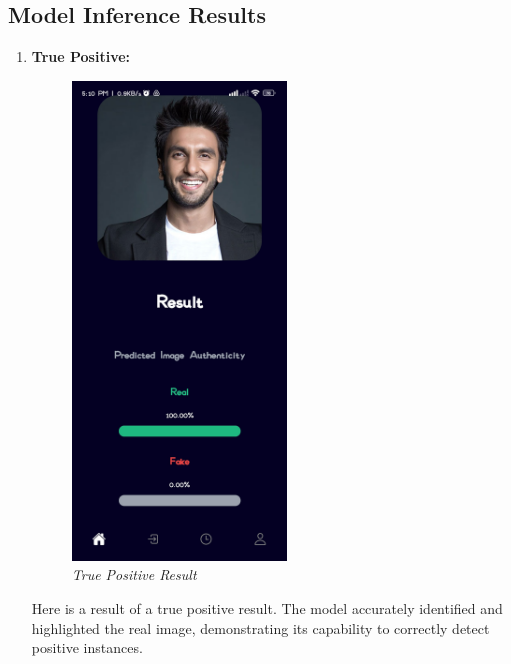 \subsection{Model Inference Results }
\begin{enumerate}
    \item \textbf{True Positive:}
    \\
    
    \begin{figure}[ht]
        \centering
              \includegraphics[height =5in  ]{img/ranveerResult.jpg}
              \caption{\textit{True Positive Result}}
          \end{figure}
         
          Here is a result of a true positive result. The model accurately identified and highlighted the real image, demonstrating its capability to correctly detect positive instances.


\end{enumerate}
